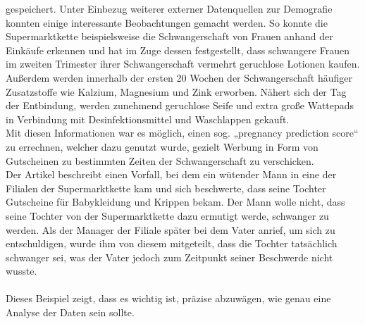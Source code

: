 gespeichert. Unter Einbezug weiterer externer Datenquellen zur Demografie
konnten einige interessante Beobachtungen gemacht werden. So konnte die
Supermarktkette beispielsweise die Schwangerschaft von Frauen anhand der
Einkäufe erkennen und hat im Zuge dessen festgestellt, dass schwangere Frauen
im zweiten Trimester ihrer Schwangerschaft vermehrt geruchlose Lotionen kaufen.
Außerdem werden innerhalb der ersten 20 Wochen der Schwangerschaft häufiger
Zusatzstoffe wie Kalzium, Magnesium und Zink erworben. Nähert sich der Tag der
Entbindung, werden zunehmend geruchlose Seife und extra große Wattepads in
Verbindung mit Desinfektionsmittel und Waschlappen gekauft. \\
Mit diesen Informationen war es möglich, einen sog. „pregnancy prediction score“
zu errechnen, welcher dazu genutzt wurde, gezielt Werbung in Form von Gutscheinen
zu bestimmten Zeiten der Schwangerschaft zu verschicken. \\
Der Artikel beschreibt einen Vorfall, bei dem ein wütender Mann in eine der
Filialen der Supermarktkette kam und sich beschwerte, dass seine Tochter
Gutscheine für Babykleidung und Krippen bekam. Der Mann wolle nicht, dass seine
Tochter von der Supermarktkette dazu ermutigt werde, schwanger zu werden. Als
der Manager der Filiale später bei dem Vater anrief, um sich zu entschuldigen,
wurde ihm von diesem mitgeteilt, dass die Tochter tatsächlich schwanger sei, was der Vater
jedoch zum Zeitpunkt seiner Beschwerde nicht wusste. \\
\\
Dieses Beispiel zeigt, dass es wichtig ist, präzise abzuwägen, wie genau eine
Analyse der Daten sein sollte. \\
